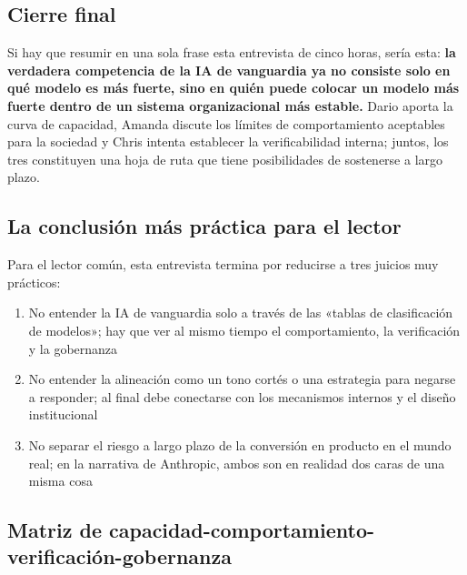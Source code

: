 \documentclass[a4paper]{article}
\begin{document}
\subsection{Cierre final}

Si hay que resumir en una sola frase esta entrevista de cinco horas, sería esta: \textbf{la verdadera competencia de la IA de vanguardia ya no consiste solo en qué modelo es más fuerte, sino en quién puede colocar un modelo más fuerte dentro de un sistema organizacional más estable.} Dario aporta la curva de capacidad, Amanda discute los límites de comportamiento aceptables para la sociedad y Chris intenta establecer la verificabilidad interna; juntos, los tres constituyen una hoja de ruta que tiene posibilidades de sostenerse a largo plazo.

\subsection{La conclusión más práctica para el lector}

Para el lector común, esta entrevista termina por reducirse a tres juicios muy prácticos:

\begin{enumerate}
    \item No entender la IA de vanguardia solo a través de las «tablas de clasificación de modelos»; hay que ver al mismo tiempo el comportamiento, la verificación y la gobernanza
    \item No entender la alineación como un tono cortés o una estrategia para negarse a responder; al final debe conectarse con los mecanismos internos y el diseño institucional
    \item No separar el riesgo a largo plazo de la conversión en producto en el mundo real; en la narrativa de Anthropic, ambos son en realidad dos caras de una misma cosa
\end{enumerate}

\subsection{Matriz de capacidad-comportamiento-verificación-gobernanza}
\end{document}
